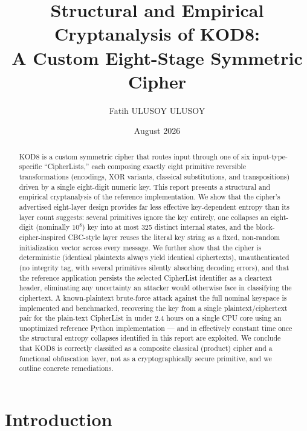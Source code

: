 \documentclass[11pt]{article}
\title{\textbf{Structural and Empirical Cryptanalysis of KOD8:\\
A Custom Eight-Stage Symmetric Cipher}}
\author{ Fatih ULUSOY ULUSOY}
\date{August 2026}
\begin{document}
\maketitle

\begin{abstract}
\noindent
KOD8 is a custom symmetric cipher that routes input through one of six
input-type-specific ``CipherLists,'' each composing exactly eight primitive
reversible transformations (encodings, XOR variants, classical
substitutions, and transpositions) driven by a single eight-digit numeric
key. This report presents a structural and empirical cryptanalysis of the
reference implementation. We show that the cipher's advertised eight-layer
design provides far less effective key-dependent entropy than its layer
count suggests: several primitives ignore the key entirely, one collapses
an eight-digit (nominally $10^{8}$) key into at most 325 distinct internal
states, and the block-cipher-inspired CBC-style layer reuses the literal
key string as a fixed, non-random initialization vector across every
message. We further show that the cipher is deterministic (identical
plaintexts always yield identical ciphertexts), unauthenticated (no
integrity tag, with several primitives silently absorbing decoding
errors), and that the reference application persists the selected
CipherList identifier as a cleartext header, eliminating any uncertainty
an attacker would otherwise face in classifying the ciphertext. A
known-plaintext brute-force attack against the full nominal keyspace is
implemented and benchmarked, recovering the key from a single
plaintext/ciphertext pair for the plain-text CipherList in under 2.4 hours
on a single CPU core using an unoptimized reference Python implementation
— and in effectively constant time once the structural entropy collapses
identified in this report are exploited. We conclude that KOD8 is
correctly classified as a composite classical (product) cipher and a
functional obfuscation layer, not as a cryptographically secure primitive,
and we outline concrete remediations.
\end{abstract}

\tableofcontents

\section{Introduction}
\end{document}
